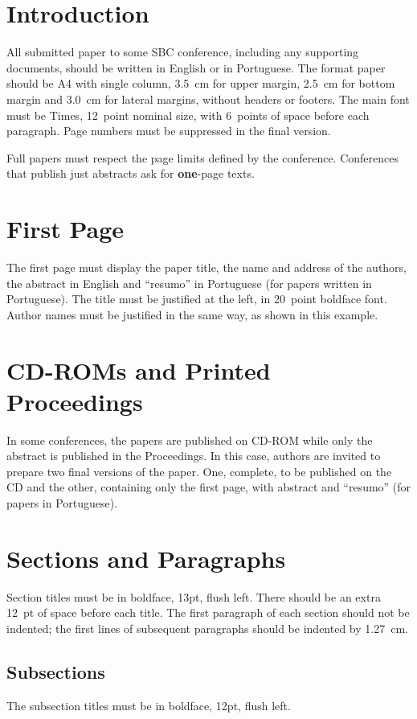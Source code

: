 \section{Introduction}
All submitted paper to some SBC conference, including any supporting
documents, should be written in English or in Portuguese. The format
paper should be A4 with single column, 3.5~cm for upper margin, 2.5~cm
for bottom margin and 3.0~cm for lateral margins, without headers or
footers. The main font must be Times, 12~point nominal size, with
6~points of space before each paragraph. Page numbers must be
suppressed in the final version.

Full papers must respect the page limits defined by the conference.
Conferences that publish just abstracts ask for \textbf{one}-page
texts.

\section{First Page}
The first page must display the paper title, the name and address of
the authors, the abstract in English and ``resumo'' in Portuguese (for
papers written in Portuguese). The title must be justified at the
left, in 20~point boldface font. Author names must be justified in the
same way, as shown in this example.

\section{CD-ROMs and Printed Proceedings}
In some conferences, the papers are published on CD-ROM while only the
abstract is published in the Proceedings. In this case, authors are
invited to prepare two final versions of the paper. One, complete, to
be published on the CD and the other, containing only the first page,
with abstract and ``resumo'' (for papers in Portuguese).

\section{Sections and Paragraphs}
Section titles must be in boldface, 13pt, flush left. There should be
an extra 12~pt of space before each title. The first paragraph of each
section should not be indented; the first lines of subsequent
paragraphs should be indented by 1.27~cm.

\subsection{Subsections}
The subsection titles must be in boldface, 12pt, flush left.

